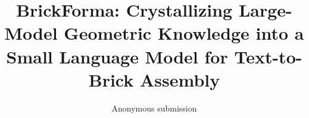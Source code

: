 \title{BrickForma: Crystallizing Large-Model Geometric Knowledge into a Small Language Model for Text-to-Brick Assembly}
\author{Anonymous submission}
\affiliations{}
